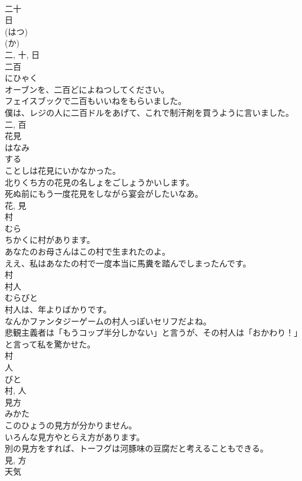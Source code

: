 \documentclass[8pt]{extreport}
\begin{document}
\begin{CJK}{UTF8}{min}
\\	二十 
\\	日 
\\	(はつ) 
\\	(か) 
\\	二, 十, 日	
\\	二百	
\\	にひゃく	
\\	オーブンを、二百どによねつしてください。	
\\	フェイスブックで二百もいいねをもらいました。	
\\	僕は、レジの人に二百ドルをあげて、これで制汗剤を買うように言いました。	
\\	二, 百	
\\	花見	
\\	はなみ	
\\	する 
\\	ことしは花見にいかなかった。	
\\	北りくち方の花見の名しょをごしょうかいします。	
\\	死ぬ前にもう一度花見をしながら宴会がしたいなあ。	
\\	花, 見	
\\	村	
\\	むら	
\\	ちかくに村があります。	
\\	あなたのお母さんはこの村で生まれたのよ。	
\\	ええ、私はあなたの村で一度本当に馬糞を踏んでしまったんです。	
\\	村	
\\	村人	
\\	むらびと	
\\	村人は、年よりばかりです。	
\\	なんかファンタジーゲームの村人っぽいセリフだよね。	
\\	悲観主義者は「もうコップ半分しかない」と言うが、その村人は「おかわり！」と言って私を驚かせた。	
\\	村 
\\	人 
\\	びと 
\\	村, 人	
\\	見方	
\\	みかた	
\\	このひょうの見方が分かりません。	
\\	いろんな見方やとらえ方があります。	
\\	別の見方をすれば、トーフグは河豚味の豆腐だと考えることもできる。	
\\	見, 方	
\\	天気	

\end{CJK}
\end{document}
